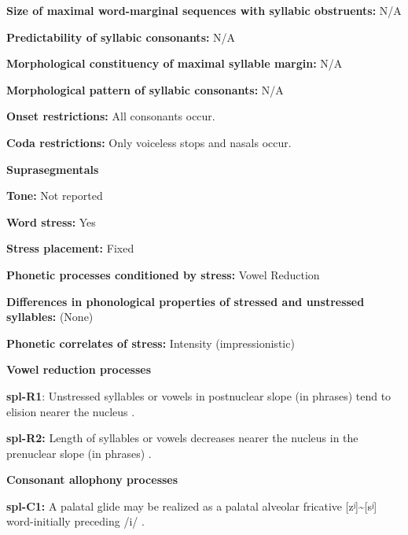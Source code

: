 \textbf{Size of maximal word{}-marginal sequences with syllabic obstruents:} N/A



\textbf{Predictability of syllabic consonants:} N/A



\textbf{Morphological constituency of maximal syllable margin:} N/A



\textbf{Morphological pattern of syllabic consonants:} N/A



\textbf{Onset restrictions:} All consonants occur.



\textbf{Coda restrictions:} Only voiceless stops and nasals occur.



\textbf{Suprasegmentals}



\textbf{Tone:} Not reported



\textbf{Word stress:} Yes



\textbf{Stress placement:} Fixed



\textbf{Phonetic processes conditioned by stress:} Vowel Reduction



\textbf{Differences in phonological properties of stressed and unstressed syllables:} (None)



\textbf{Phonetic correlates of stress:} Intensity (impressionistic)



\textbf{Vowel reduction processes}



\textbf{spl-R1}: Unstressed syllables or vowels in postnuclear slope (in phrases) tend to elision nearer the nucleus \citep[6]{McElhanon1970}.



\textbf{spl-R2:} Length of syllables or vowels decreases nearer the nucleus in the prenuclear slope (in phrases) \citep[6]{McElhanon1970}.



\textbf{Consonant allophony processes}



\textbf{spl-C1:} A palatal glide may be realized as a palatal alveolar fricative [zʲ]{\textasciitilde}[sʲ] word-initially preceding /i/ \citep{McElhanon1970}.



